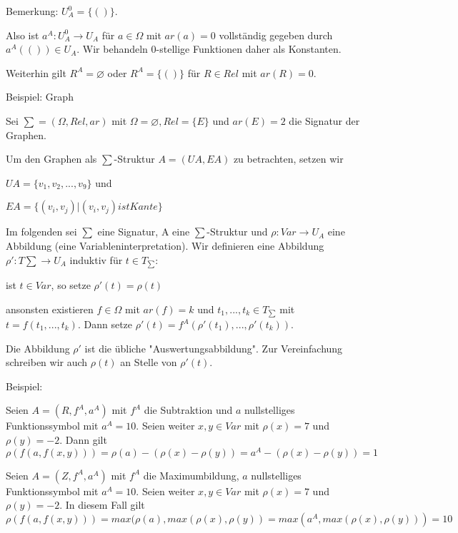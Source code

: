 \documentclass[a4paper]{article}
\begin{document}
\begin{multicols}{3}
  Bemerkung: $U_A^0=\{()\}$.
  \begin{itemize*}
    \item Also ist $a^A:U_A^0\rightarrow U_A$ für $a\in\Omega$ mit $ar(a)=0$ vollständig gegeben durch $a^A(())\in U_A$. Wir behandeln 0-stellige Funktionen daher als Konstanten.
    \item Weiterhin gilt $R^A=\varnothing$ oder $R^A=\{()\}$ für $R\in Rel$ mit $ar(R)=0$.
  \end{itemize*}

  Beispiel: Graph
  \begin{itemize*}
    \item Sei $\sum=(\Omega ,Rel,ar)$ mit $\Omega=\varnothing ,Rel=\{E\}$ und $ar(E)=2$ die Signatur der Graphen.
    \item Um den Graphen als $\sum$-Struktur $A=(UA,EA)$ zu betrachten, setzen wir
    \begin{itemize*}
      \item $UA=\{v_1,v_2,...,v_9\}$ und
      \item $EA=\{(v_i,v_j)|(v_i,v_j) ist Kante\}$
    \end{itemize*}
  \end{itemize*}

  Im folgenden sei $\sum$ eine Signatur, A eine $\sum$-Struktur und $\rho:Var\rightarrow U_A$ eine Abbildung (eine Variableninterpretation).
  Wir definieren eine Abbildung $\rho':T\sum\rightarrow U_A$ induktiv für $t\in T_{\sum}$:
  \begin{itemize*}
    \item ist $t\in Var$, so setze $\rho'(t) =\rho(t)$
    \item ansonsten existieren $f\in\Omega$ mit $ar(f)=k$ und $t_1,...,t_k\in T_{\sum}$ mit $t=f(t_1,...,t_k)$. Dann setze $\rho'(t) =f^A(\rho'(t_1),...,\rho'(t_k))$.
  \end{itemize*}
  Die Abbildung $\rho'$ ist die übliche "Auswertungsabbildung".
  Zur Vereinfachung schreiben wir auch $\rho(t)$ an Stelle von $\rho'(t)$.

  Beispiel:
  \begin{itemize*}
    \item Seien $A=(R,f^A,a^A)$ mit $f^A$ die Subtraktion und $a$ nullstelliges Funktionssymbol mit $a^A=10$. Seien weiter $x,y\in Var$ mit $\rho(x)=7$ und $\rho(y)=-2$. Dann gilt $\rho(f(a,f(x,y))) =\rho(a)-(\rho(x)-\rho(y)) =a^A-(\rho(x)-\rho(y)) = 1$
    \item Seien $A= (Z,f^A,a^A)$ mit $f^A$ die Maximumbildung, $a$ nullstelliges Funktionssymbol mit $a^A=10$. Seien weiter $x,y\in Var$ mit $\rho(x)=7$ und $\rho(y)=-2$. In diesem Fall gilt $\rho(f(a,f(x,y))) = max(\rho(a),max(\rho(x),\rho(y)) = max(a^A,max(\rho(x),\rho(y))) = 10$
  \end{itemize*}


\end{multicols}
\end{document}
